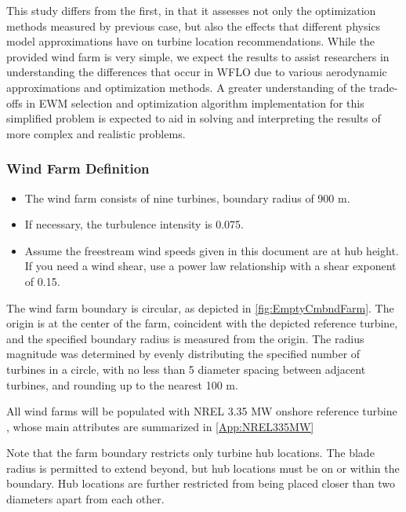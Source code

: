 \documentclass[12pt]{article}
\begin{document}
    This study differs from the first, in that it assesses not only the optimization methods measured by previous case, but also the effects that different physics model approximations have on turbine location recommendations. While the provided wind farm is very simple, we expect the results to assist researchers in understanding the differences that occur in WFLO due to various aerodynamic approximations and optimization methods. A greater understanding of the trade-offs in EWM selection and optimization algorithm implementation for this simplified problem is expected to aid in solving and interpreting the results of more complex and realistic problems.
    
    \subsubsection{Wind Farm Definition}
    \begin{itemize}
        \item The wind farm consists of nine turbines, boundary radius of 900 m.
        \item If necessary, the turbulence intensity is 0.075.
        \item Assume the freestream wind speeds given in this document are at hub height. If you need a wind shear, use a power law relationship with a shear exponent of 0.15.
    \end{itemize}
    
    The wind farm boundary is circular, as depicted in \cref{fig:EmptyCmbndFarm}. The origin is at the center of the farm, coincident with the depicted reference turbine, and the specified boundary radius is measured from the origin. The radius magnitude was determined by evenly distributing the specified number of turbines in a circle, with no less than 5 diameter spacing between adjacent turbines, and rounding up to the nearest 100 m.
    
    All wind farms will be populated with NREL 3.35 MW onshore reference turbine \cite{NREL335MW}, whose main attributes are summarized in \cref{App:NREL335MW}
    
    Note that the farm boundary restricts only turbine hub locations. The blade radius is permitted to extend beyond, but hub locations must be on or within the boundary. Hub locations are further restricted from being placed closer than two diameters apart from each other.
    
\end{document}
